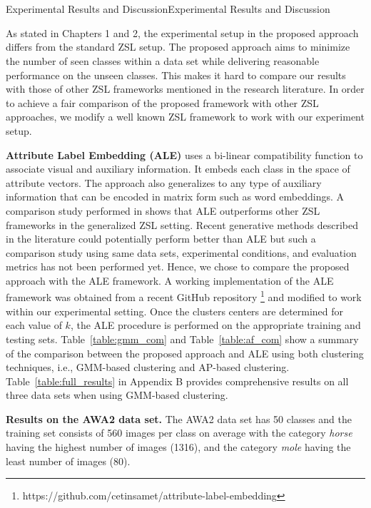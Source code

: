 \chapter{}{{Experimental Results and Discussion}}{Experimental Results and Discussion}

As stated in Chapters 1 and 2, the experimental setup in the proposed approach differs from the standard ZSL setup. The proposed approach aims to minimize the number of seen classes within a data set while delivering reasonable performance on the unseen classes. This makes it hard to compare our results with those of other ZSL frameworks mentioned in the research literature. In order to achieve a fair comparison of the proposed framework with other ZSL approaches, we modify a well known ZSL framework to work with our experiment setup. 

\par
\medskip
 
\textbf{Attribute Label Embedding (ALE)} \cite{ale} uses a bi-linear compatibility function to associate visual and auxiliary information. It embeds each class in the space of attribute vectors. The approach also generalizes to any type of auxiliary information that can be encoded in matrix form such as word embeddings. A comparison study performed in \cite{gbu} shows that ALE outperforms other ZSL frameworks in the generalized ZSL setting. Recent generative methods described in the literature could potentially perform better than ALE but such a comparison study using same data sets, experimental conditions, and evaluation metrics has not been performed yet. Hence, we chose to compare the proposed approach with the ALE framework. A working implementation of the ALE framework was obtained from a recent GitHub repository \footnote{https://github.com/cetinsamet/attribute-label-embedding}
and modified to work within our experimental setting. Once the clusters centers are determined for each value of $k$, the ALE procedure is performed on the appropriate training and testing sets. Table~\ref{table:gmm_com} and Table~\ref{table:af_com} show a summary of the comparison between the proposed approach and ALE using both clustering techniques, i.e., GMM-based clustering and AP-based clustering. Table~\ref{table:full_results} in Appendix B provides comprehensive results on all three data sets when using GMM-based clustering.

\par
\medskip
\noindent 
\textbf{Results on the AWA2 data set.} The AWA2 data set has 50 classes and the training set consists of 560 images per class on average with the category \textit{horse} having the highest number of images (1316), and  the category \textit{mole} having the least number of images (80). 

